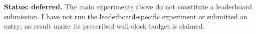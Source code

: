 
\textbf{Status: deferred.}
The main experiments above do not constitute a leaderboard submission.
I have not run the leaderboard-specific experiment or submitted an entry;
no result under its prescribed wall-clock budget is claimed.
